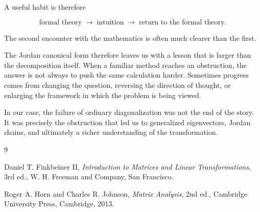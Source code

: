 \documentclass[11pt]{article}
\begin{document}
A useful habit is therefore

\[
\boxed{
\text{formal theory}
\;\longrightarrow\;
\text{intuition}
\;\longrightarrow\;
\text{return to the formal theory}.
}
\]

The second encounter with the mathematics is often much clearer than
the first.

The Jordan canonical form therefore leaves us with a lesson that is
larger than the decomposition itself.  When a familiar method reaches
an obstruction, the answer is not always to push the same calculation
harder.  Sometimes progress comes from changing the question, reversing
the direction of thought, or enlarging the framework in which the
problem is being viewed.

In our case, the failure of ordinary diagonalization was not the end
of the story.  It was precisely the obstruction that led us to
generalized eigenvectors, Jordan chains, and ultimately a richer
understanding of the transformation.

\begin{thebibliography}{9}

Daniel T. Finkbeiner II,
\emph{Introduction to Matrices and Linear Transformations},
3rd ed.,
W. H. Freeman and Company,
San Francisco.

Roger A. Horn and Charles R. Johnson,
\emph{Matrix Analysis},
2nd ed.,
Cambridge University Press,
Cambridge,
2013.

\end{thebibliography}
\end{document}
